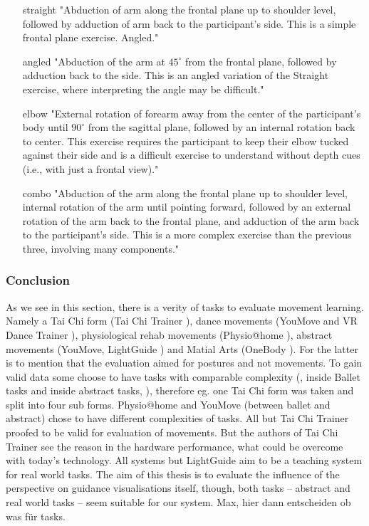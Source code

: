 \begin{itemize}
	\item[straight] "Abduction of arm along the frontal plane up to shoulder level, followed by adduction of arm back to the participant’s side. This is a simple frontal plane exercise.
	Angled."
	\item[angled] "Abduction of the arm at $45^\circ$ from the frontal plane, followed by adduction back to the side. This is an angled variation of the Straight exercise, where interpreting the angle may be difficult."
	\item[elbow] "External rotation of forearm away from the center of the participant’s body until $90^\circ$ from the sagittal plane, followed by an internal rotation back to center. This exercise requires the participant to keep their elbow tucked against their side and is a difficult exercise to understand without depth cues (i.e., with just a frontal view)."
	\item[combo] "Abduction of the arm along the frontal plane up to shoulder level, internal rotation of the arm until pointing forward, followed by an external rotation of the arm back to the frontal plane, and adduction of the arm back to the participant’s side. This is a more complex exercise than the previous three, involving many components."
\end{itemize}

\subsubsection{Conclusion}
As we see in this section, there is a verity of tasks to evaluate movement learning. Namely a Tai Chi form (Tai Chi Trainer \cite{Chua2003}), dance movements (YouMove \cite{Anderson2013a} and VR Dance Trainer \cite{Chan2011a}), physiological rehab movements (Physio@home \cite{Tang2015}), abstract movements (YouMove, LightGuide \cite{Sodhi2012}) and Matial Arts (OneBody \cite{Hoang2016}). For the latter is to mention that the evaluation aimed for postures and not movements. To gain valid data some choose to have tasks with comparable complexity (\cite{Chua2003}, \cite{Anderson2013a} inside Ballet tasks and inside abstract tasks, \cite{Sodhi2012}), therefore eg. one Tai Chi form was taken and split into four sub forms. Physio@home and YouMove (between ballet and abstract) chose to have different complexities of tasks. All but Tai Chi Trainer proofed to be valid for evaluation of movements. But the authors of Tai Chi Trainer see the reason in the hardware performance, what could be overcome with today's technology. All systems but LightGuide aim to be a teaching system for real world tasks. The aim of this thesis is to evaluate the influence of the perspective on guidance visualisations itself, though, both tasks \--- abstract and real world tasks \--- seem suitable for our system. Max, hier dann entscheiden ob was für tasks.


